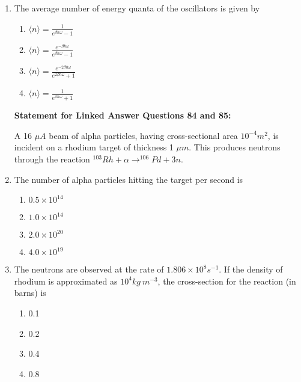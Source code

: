 \documentclass[journal]{IEEEtran}
\begin{document}
\begin{enumerate}[start=69]
\item The average number of energy quanta of the oscillators is given by
\begin{multicols}{4}
\begin{enumerate}
\item $\langle n \rangle = \frac{1}{e^{\beta\hbar\omega}-1}$
\item $\langle n \rangle = \frac{e^{-\beta\hbar\omega}}{e^{\beta\hbar\omega}-1}$
\item $\langle n \rangle = \frac{e^{-2\beta\hbar\omega}}{e^{2\beta\hbar\omega}+1}$
\item $\langle n \rangle = \frac{1}{e^{\beta\hbar\omega}+1}$
\end{enumerate}
\end{multicols}

 \textbf{Statement for Linked Answer Questions 84 and 85:}

A 16 $\mu A$ beam of alpha particles, having cross-sectional area $10^{-4}m^{2}$, is incident on a rhodium target of thickness 1 $\mu m$. This produces neutrons through the reaction $^{103}Rh + \alpha \rightarrow ^{106}Pd + 3n$.

\item The number of alpha particles hitting the target per second is
\begin{multicols}{4}
\begin{enumerate}
\item $0.5\times10^{14}$
\item $1.0\times10^{14}$
\item $2.0\times10^{20}$
\item $4.0\times10^{19}$
\end{enumerate}
\end{multicols}

\item The neutrons are observed at the rate of $1.806\times10^{8}s^{-1}$. If the density of rhodium is approximated as $10^{4}kg~m^{-3}$, the cross-section for the reaction (in barns) is
\begin{multicols}{4}
\begin{enumerate}
\item 0.1
\item 0.2
\item 0.4
\item 0.8
\end{enumerate}
\end{multicols}




\end{enumerate}
\end{document}
